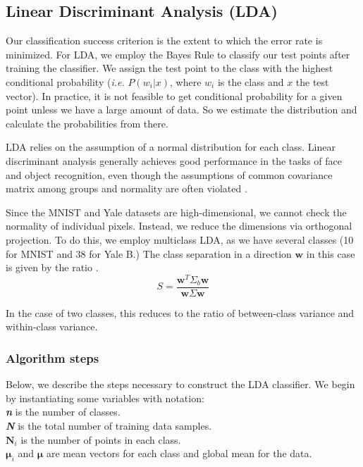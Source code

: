 \subsection{Linear Discriminant Analysis (LDA)}

Our classification success criterion is the extent to which the error rate is minimized. For LDA, we employ the Bayes Rule to classify our test points after training the classifier. We assign the test point to the class with the highest conditional probability (\textit{i.e.} $P(w_i|x)$, where $w_i$ is the class and $x$ the test vector). In practice, it is not feasible to get conditional probability for a given point unless we have a large amount of data. So we estimate the distribution and calculate the probabilities from there. 

LDA relies on the assumption of a normal distribution for each class. Linear discriminant analysis generally achieves good performance in the tasks of face and object recognition, even though the assumptions of common covariance matrix among groups and normality are often violated \cite{Li2006}.

Since the MNIST and Yale datasets are high-dimensional, we cannot check the normality of individual pixels. Instead, we reduce the dimensions via orthogonal projection.
To do this, we employ multiclass LDA, as we have several classes (10 for MNIST and 38 for Yale B.) The class separation in a direction $\pmb w$ in this case is given by the ratio \cite{wiki:LDA}.
%
\begin{equation}
  S = \frac{\pmb w^T \Sigma_b \pmb w}{\pmb w \Sigma \pmb w}  
\end{equation}

In the case of two classes, this reduces to the ratio of between-class variance and within-class variance.

\subsubsection{Algorithm steps}
Below, we describe the steps necessary to construct the LDA classifier. We begin by instantiating some variables with notation:\\
\textit{\textbf{n}} is the number of classes. \\ \textit{\textbf{N}} is the total number of training data samples. \\ $\pmb N_i$ is the number of points in each class. \\ $\pmb \mu_i$ and $\pmb \mu$ are mean vectors for each class and global mean for the data.

